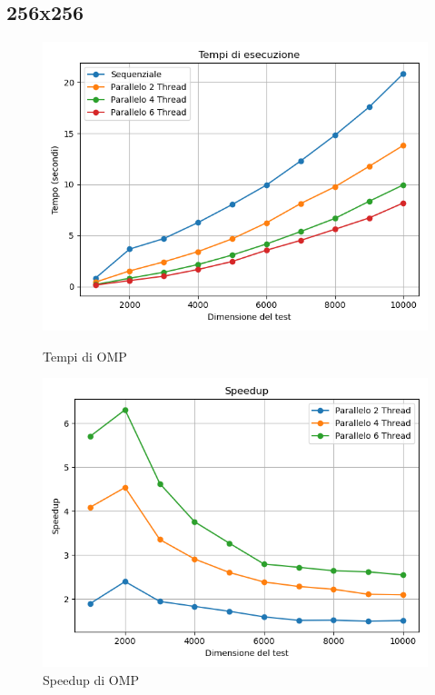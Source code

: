 \documentclass[11pt]{article}
\begin{document}
    \subsection{256x256}\label{subsec:256x256}
    \begin{figure}[H]
        \centering
        \begin{minipage}{0.49\textwidth}
            \centering
            \includegraphics[width=\textwidth]{plots/256/omp_times}
            \caption{Tempi di OMP}\label{fig:times-256-omp}
        \end{minipage}
        \begin{minipage}{0.49\textwidth}
            \centering
            \includegraphics[width=\textwidth]{plots/256/omp_speedup}
            \caption{Speedup di OMP}\label{fig:speedup-256-omp}
        \end{minipage}
    \end{figure}
\end{document}

